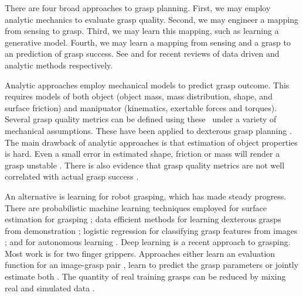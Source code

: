 There are four broad approaches to grasp planning. First, we may employ analytic mechanics to evaluate grasp quality. Second, we may engineer a mapping from sensing to grasp. Third, we may learn this mapping, such as learning a generative model. Fourth, we may learn a mapping from sensing and a grasp to an prediction of grasp success. See \cite{bohg2014data} and  \cite{sahbani2012overview} for recent reviews of data driven and analytic methods respectively.

Analytic approaches employ mechanical models to predict grasp outcome\cite{bicchi2000a,Liu2000,Pollard2004,miller2004}. This requires models of both object (object mass, mass distribution, shape, and surface friction) and manipuator (kinematics, exertable forces and torques). Several grasp quality metrics can be defined using these~\cite{Ferrari1992,Roa2015,Shimoga1996} under a variety of mechanical assumptions. These have been applied to dexterous grasp planning \cite{Boutselis2014,Gori2014,Hang2014,Rosales2012,Saut2012,ciocarlie2009hand}. The main drawback of analytic approaches is that estimation of object properties is hard. Even a small error in estimated shape, friction or mass will render a grasp unstable \cite{zheng2005a}. There is also evidence that grasp quality metrics are not well correlated with actual grasp success \cite{bekiroglu2011b,kim2013a,goins2014a}.

An alternative is learning for robot grasping, which has made steady progress. There are probabilistic machine learning techniques employed for surface estimation for grasping \cite{dragiev2011gaussian}; data efficient methods for learning dexterous grasps from demonstration \cite{ben-amor2012a,kopicki2015ijrr,detry2012a}; logistic regression for classifying grasp features from images \cite{saxena2008a}; and for autonomous learning \cite{detry2010a}. Deep learning is a recent approach to grasping. Most work is for two finger grippers. Approaches either learn an evaluation function for an image-grasp pair \cite{levine16,lenz2015deep,gualtieri2016high,mahler2017dex,pinto2016supersizing,johns2016deep}, learn to predict the grasp parameters \cite{redmon2015real,kumra2017iros} or jointly estimate both \cite{morrison18}. The quantity of real training grasps can be reduced by mixing real and simulated data \cite{bousmalis2017using}. 

